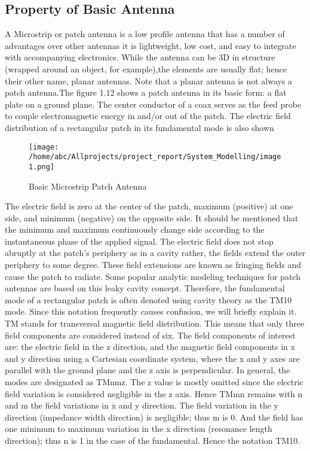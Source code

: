 
\subsection{Property of Basic Antenna}\label{sub:Property of Basic Antenna}
	  \justify
	   A Microstrip or patch antenna is a low profile antenna that has a number of advantages  over other antennas it is lightweight, low cost, and easy to integrate with accompanying  electronics. While the antenna can be 3D in structure (wrapped around an object, for example),the elements are usually flat; hence their other name, planar antennas. Note that a planar antenna is not always a patch antenna.The figure 1.12 shows a patch antenna in its basic form: a flat plate on a ground plane. The center conductor of a coax serves as the feed probe to couple electromagnetic energy in and/or out of the patch. The electric field distribution of a rectangular patch in its fundamental mode is also shown

		   \begin{figure}[h]
		   	\centering
			 \texttt{[image: /home/abc/Allprojects/project\_report/System\_Modelling/image1.png]}
			 \caption{Basic Microstrip Patch Antenna}
		   \end{figure}

	  \justify
	   The electric field is zero at the center of the patch, maximum (positive) at one side, and minimum (negative) on the opposite side. It should be mentioned that the minimum and maximum continuously change side according to the instantaneous phase of the applied signal. The electric field does not stop abruptly at the patch's periphery as in a cavity rather, the fields extend the outer periphery to some degree. These field extensions are known as fringing fields and cause the patch to radiate. Some popular analytic modeling techniques for patch antennas are based on this leaky cavity concept. Therefore, the fundamental mode of a rectangular patch is often denoted using cavity theory as the TM10 mode.
	 \justify
	   Since this notation frequently causes confusion, we will briefly explain it. TM stands for transversal  magnetic field distribution. This means that only three field components are considered instead of six. The field components of interest are: the electric field in the z direction, and the magnetic field components in x and y direction using a Cartesian coordinate system, where the x and y axes are parallel with the ground plane and the z axis is perpendicular. In general, the modes are designated as TMnmz. The z value is mostly omitted since the electric field variation is considered negligible in the z axis. Hence TMmn remains with n and m the field variations in x and y direction. The field variation in the y direction (impedance width direction) is negligible; thus m is 0. And the field has one minimum to maximum variation in the x direction (resonance length direction); thus n is 1 in the case of the fundamental. Hence the notation TM10.

